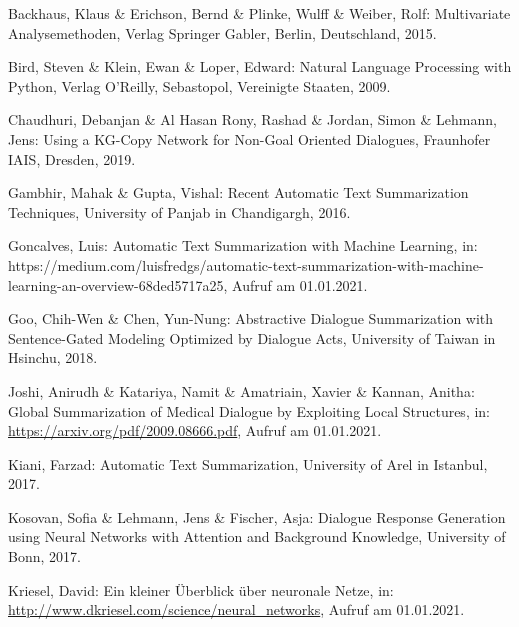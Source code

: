 \setcounter{page}{50}

\begin{thebibliography}{50}
\thispagestyle{fancy}

Backhaus, Klaus \& Erichson, Bernd \& Plinke, Wulff \& Weiber, Rolf: Multivariate Analysemethoden, Verlag Springer Gabler, Berlin, Deutschland, 2015.

Bird, Steven \& Klein, Ewan \& Loper, Edward: Natural Language Processing with Python, Verlag O'Reilly, Sebastopol, Vereinigte Staaten, 2009.

Chaudhuri, Debanjan \& Al Hasan Rony, Rashad \& Jordan, Simon \& Lehmann, Jens: Using a KG-Copy Network for Non-Goal Oriented Dialogues, Fraunhofer IAIS, Dresden, 2019.

Gambhir, Mahak \& Gupta, Vishal: Recent Automatic Text Summarization Techniques, University of Panjab in Chandigargh, 2016.

Goncalves, Luis: Automatic Text Summarization with Machine Learning, in: https://medium.com/luisfredgs/automatic-text-summarization-with-machine-learning-an-overview-68ded5717a25, Aufruf am 01.01.2021.

Goo, Chih-Wen \& Chen, Yun-Nung: Abstractive Dialogue Summarization with Sentence-Gated Modeling Optimized by Dialogue Acts, University of Taiwan in Hsinchu, 2018.

Joshi, Anirudh \& Katariya, Namit \& Amatriain, Xavier \& Kannan, Anitha: Global Summarization of Medical Dialogue by Exploiting Local Structures, in: \url{https://arxiv.org/pdf/2009.08666.pdf}, Aufruf am 01.01.2021.

Kiani, Farzad: Automatic Text Summarization, University of Arel in Istanbul, 2017.

Kosovan, Sofia \& Lehmann, Jens \& Fischer, Asja: Dialogue Response Generation using Neural Networks with Attention and Background Knowledge, University of Bonn, 2017.

Kriesel, David: Ein kleiner Überblick über neuronale Netze, in: \url{http://www.dkriesel.com/science/neural_networks}, Aufruf am 01.01.2021.


\end{thebibliography}

